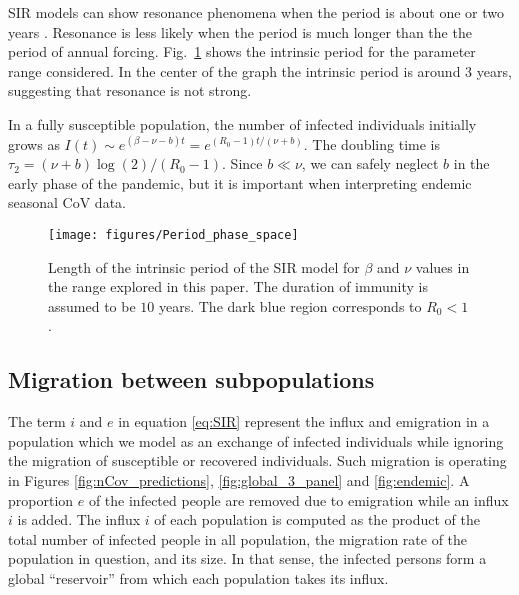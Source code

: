 \documentclass[rmp, reprint, superscriptaddress, floatfix,amsmath]{revtex4-1}
\begin{document}
SIR models can show resonance phenomena when the period is about one or two years \citep{dushoff_dynamical_2004,chen_regular_2017}.
Resonance is less likely when the period is much longer than the the period of annual forcing.
Fig.~\ref{fig:intrinsicPeriod} shows the intrinsic period for the parameter range considered. 
In the center of the graph the intrinsic period is around 3 years, suggesting that resonance is not strong.

In a fully susceptible population, the number of infected individuals initially grows as $I(t)\sim e^{(\beta-\nu-b)t} = e^{(R_0-1)t/(\nu+b)}$.
The doubling time is $\tau_2 = (\nu+b)\log(2)/(R_0-1)$.
Since $b\ll \nu$, we can safely neglect $b$ in the early phase of the pandemic, but it is important when interpreting endemic seasonal CoV data. 


\begin{figure}[htb]
	\centering
	\texttt{[image: figures/Period\_phase\_space]}
	\caption{Length of the intrinsic period of the SIR model for $\beta$ and $\nu$ values in the range explored in this paper. The duration of immunity is assumed to be $10$ years. The dark blue region corresponds to $R_0<1$. }
	\label{fig:intrinsicPeriod}
\end{figure}


\subsection*{Migration between subpopulations}

The term $i$ and $e$ in equation \ref{eq:SIR} represent the influx and emigration in a population which we model as an exchange of infected individuals while ignoring the migration of susceptible or recovered individuals.
Such migration is operating in Figures \ref{fig:nCov_predictions}, \ref{fig:global_3_panel} and \ref{fig:endemic}. 
A proportion $e$ of the infected people are removed due to emigration while an influx $i$ is added.
The influx $i$ of each population is computed as the product of the total number of infected people in all population, the migration rate of the population in question, and its size. 
In that sense, the infected persons form a global ``reservoir'' from which each population takes its influx.
\end{document}
